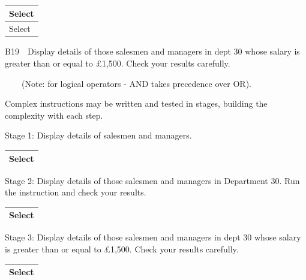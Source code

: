 \begin{flushleft}
\tablefirsthead{}
\tablehead{}
\tabletail{}
\tablelasttail{}
\begin{supertabular}{|m{14.303cm}|}
\hline
Select 

\\\hline
Select 

\\\hline
\end{supertabular}
\end{flushleft}
B19\ \ Display details of those salesmen and managers in dept 30 whose salary is greater than or equal to £1,500.  Check your results carefully.

\ \ \ \ (Note: for logical operators - AND takes precedence over OR).

Complex instructions may be written and tested in stages, building the complexity with each step.

Stage 1: Display details of salesmen and managers.

\begin{flushleft}
\tablefirsthead{}
\tablehead{}
\tabletail{}
\tablelasttail{}
\begin{supertabular}{|m{14.303cm}|}
\hline
Select 

\\\hline
\end{supertabular}
\end{flushleft}
Stage 2: Display details of those salesmen and managers in Department 30.  Run the instruction and check your results.

\begin{flushleft}
\tablefirsthead{}
\tablehead{}
\tabletail{}
\tablelasttail{}
\begin{supertabular}{|m{14.303cm}|}
\hline
Select 

\\\hline
\end{supertabular}
\end{flushleft}
Stage 3: Display details of those salesmen and managers in dept 30 whose salary is greater than or equal to £1,500.  Check your results carefully.

\begin{flushleft}
\tablefirsthead{}
\tablehead{}
\tabletail{}
\tablelasttail{}
\begin{supertabular}{|m{14.303cm}|}
\hline
Select 

\\\hline
\end{supertabular}
\end{flushleft}
